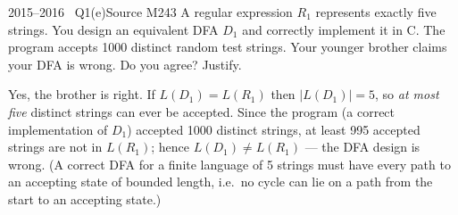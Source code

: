 \documentclass[11pt,a4paper]{article}
\begin{document}
\begin{question}{2015--2016 \textbullet\ Q1(e)}{Source M24}{3}
A regular expression $R_1$ represents exactly five strings. You design an equivalent DFA $D_1$ and correctly implement it in C. The program accepts 1000 distinct random test strings. Your younger brother claims your DFA is wrong. Do you agree? Justify.
\end{question}
\begin{solution}
Yes, the brother is right. If $L(D_1)=L(R_1)$ then $|L(D_1)|=5$, so \emph{at most five} distinct strings can ever be accepted. Since the program (a correct implementation of $D_1$) accepted 1000 distinct strings, at least 995 accepted strings are not in $L(R_1)$; hence $L(D_1)\neq L(R_1)$ --- the DFA design is wrong. (A correct DFA for a finite language of 5 strings must have every path to an accepting state of bounded length, i.e.\ no cycle can lie on a path from the start to an accepting state.)
\end{solution}
\end{document}
